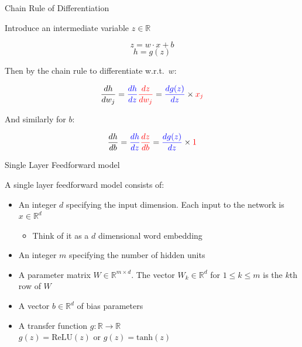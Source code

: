 \begin{frame}{Chain Rule of Differentiation}
\begin{block}{Introduce an intermediate variable $z \in \mathbb{R}$}

\[ z = w \cdot x + b \]
\[ h = g(z) \]

Then by the chain rule to differentiate w.r.t.\ $w$:

\[ \frac{dh}{dw_j} = \textcolor{blue}{\frac{dh}{dz}} \textcolor{red}{\frac{dz}{dw_j}} = \textcolor{blue}{\frac{dg(z)}{dz}} \times \textcolor{red}{x_j}\]

\pause
And similarly for $b$:

\[ \frac{dh}{db} = \textcolor{blue}{\frac{dh}{dz}} \textcolor{red}{\frac{dz}{db}}= \textcolor{blue}{\frac{dg(z)}{dz}} \times \textcolor{red}{1}\]

\end{block}
\end{frame}

\begin{frame}{Single Layer Feedforward model}
\begin{block}{A single layer feedforward model consists of:}
\begin{itemize}[<+->]
\item An integer $d$ specifying the input dimension. Each input to the network is $x \in \mathbb{R}^d$
  \begin{itemize}
  \item Think of it as a $d$ dimensional word embedding
  \end{itemize}
\item An integer $m$ specifying the number of hidden units
\item A parameter matrix $W \in \mathbb{R}^{m \times d}$. The vector $W_k \in \mathbb{R}^d$ for $1 \leq k \leq m$ is the $k$th row of $W$
\item A vector $b \in \mathbb{R}^d$ of bias parameters
\item A transfer function $g : \mathbb{R} \rightarrow \mathbb{R}$\\
$g(z) = \textrm{ReLU}(z)$ or $g(z) = \textrm{tanh}(z)$
\end{itemize}
\end{block}
\end{frame}

